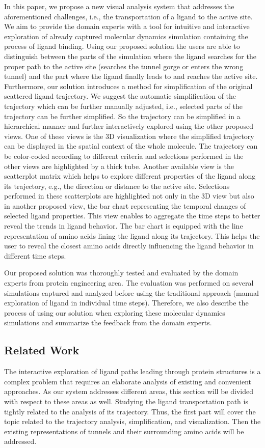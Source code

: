 \documentclass[twocolumn]{bmcart}%
\begin{document}
In this paper, we propose a new visual analysis system that addresses the aforementioned challenges, i.e., the transportation of a ligand to the active site. 
We aim to provide the domain experts with a tool for intuitive and interactive exploration of already captured molecular dynamics simulation containing the process of ligand binding. 
Using our proposed solution the users are able to distinguish between the parts of the simulation where the ligand searches for the proper path to the active site (searches the tunnel gorge or enters the wrong tunnel) and the part where the ligand finally leads to and reaches the active site.
Furthermore, our solution introduces a method for simplification of the original scattered ligand trajectory.
We suggest the automatic simplification of the trajectory which can be further manually adjusted, i.e., selected parts of the trajectory can be further simplified.
So the trajectory can be simplified in a hierarchical manner and further interactively explored using the other proposed views.
One of these views is the 3D visualization where the simplified trajectory can be displayed in the spatial context of the whole molecule.
The trajectory can be color-coded according to different criteria and selections performed in the other views are highlighted by a thick tube.
Another available view is the scatterplot matrix which helps to explore different properties of the ligand along its trajectory, e.g., the direction or distance to the active site. 
Selections performed in these scatterplots are highlighted not only in the 3D view but also in another proposed view, the bar chart representing the temporal changes of selected ligand properties. 
This view enables to aggregate the time steps to better reveal the trends in ligand behavior.
The bar chart is equipped with the line representation of amino acids lining the ligand along its trajectory. 
This helps the user to reveal the closest amino acids directly influencing the ligand behavior in different time steps.

Our proposed solution was thoroughly tested and evaluated by the domain experts from protein engineering area.
The evaluation was performed on several simulations captured and analyzed before using the traditional approach (manual exploration of ligand in individual time steps). 
Therefore, we also describe the process of using our solution when exploring these molecular dynamics simulations and summarize the feedback from the domain experts.

\subsection*{Related Work}
The interactive exploration of ligand paths leading through protein structures is a complex problem that requires an elaborate analysis of existing and convenient approaches.
As our system addresses different areas, this section will be divided with respect to these areas as well. 
Studying the ligand transportation path is tightly related to the analysis of its trajectory.
Thus, the first part will cover the topic related to the trajectory analysis, simplification, and visualization.
Then the existing representations of tunnels and their surrounding amino acids will be addressed.
\end{document}
